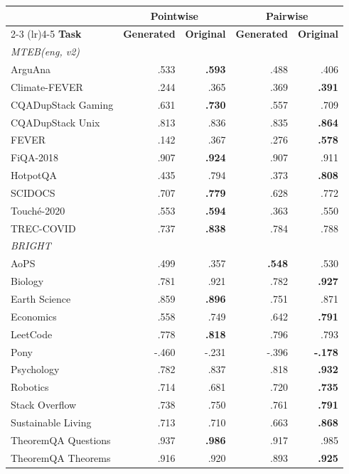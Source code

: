 \begin{table}[t]
\centering\small
\setlength{\tabcolsep}{4pt}
\begin{tabular}{lrrrr}
\toprule
 & \multicolumn{2}{c}{\textbf{Pointwise}} & \multicolumn{2}{c}{\textbf{Pairwise}} \\
\cmidrule(lr){2-3} \cmidrule(lr){4-5}
\textbf{Task} & \textbf{Generated} & \textbf{Original} & \textbf{Generated} & \textbf{Original} \\
\midrule
\multicolumn{5}{l}{\textit{MTEB(eng, v2)}} \\
ArguAna & .533 & \textbf{.593} & .488 & .406 \\
Climate-FEVER & .244 & .365 & .369 & \textbf{.391} \\
CQADupStack Gaming & .631 & \textbf{.730} & .557 & .709 \\
CQADupStack Unix & .813 & .836 & .835 & \textbf{.864} \\
FEVER & .142 & .367 & .276 & \textbf{.578} \\
FiQA-2018 & .907 & \textbf{.924} & .907 & .911 \\
HotpotQA & .435 & .794 & .373 & \textbf{.808} \\
SCIDOCS & .707 & \textbf{.779} & .628 & .772 \\
Touché-2020 & .553 & \textbf{.594} & .363 & .550 \\
TREC-COVID & .737 & \textbf{.838} & .784 & .788 \\
\midrule
\multicolumn{5}{l}{\textit{BRIGHT}} \\
AoPS & .499 & .357 & \textbf{.548} & .530 \\
Biology & .781 & .921 & .782 & \textbf{.927} \\
Earth Science & .859 & \textbf{.896} & .751 & .871 \\
Economics & .558 & .749 & .642 & \textbf{.791} \\
LeetCode & .778 & \textbf{.818} & .796 & .793 \\
Pony & -.460 & -.231 & -.396 & \textbf{-.178} \\
Psychology & .782 & .837 & .818 & \textbf{.932} \\
Robotics & .714 & .681 & .720 & \textbf{.735} \\
Stack Overflow & .738 & .750 & .761 & \textbf{.791} \\
Sustainable Living & .713 & .710 & .663 & \textbf{.868} \\
TheoremQA Questions & .937 & \textbf{.986} & .917 & .985 \\
TheoremQA Theorems & .916 & .920 & .893 & \textbf{.925} \\

\end{tabular}
\end{table}
